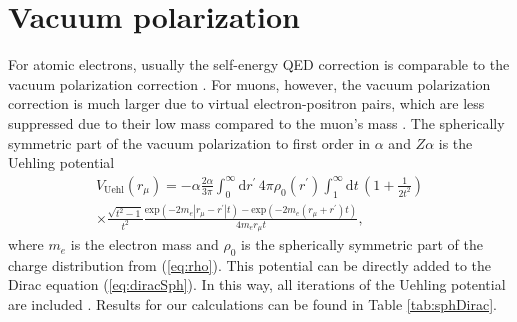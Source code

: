 \section{Vacuum polarization}
\label{sec:qed}

For atomic electrons, usually the self-energy QED correction is comparable to the vacuum polarization correction \cite{Beier2000}. For muons, however, the vacuum polarization correction is much larger due to virtual electron-positron pairs, which are less suppressed due to their low mass compared to the muon's mass \cite{BorieRinker1982}. The spherically symmetric part of the vacuum polarization to first order in $\alpha$ and $Z\alpha$ is the Uehling potential \cite{Elizarov2005}
\begin{align}
V_{\text{Uehl}}(r_\mu)=-\alpha \frac{2\alpha}{3\pi}\int_0^\infty \text{d}r^{\prime}\,4\pi \rho_0(r^\prime)\int_1^\infty \text{d}t\,\left( 1+\frac{1}{2t^2} \right)\nonumber\\
\times\frac{\sqrt{t^2-1}}{t^2} \frac{\text{exp}(-2m_e|r_\mu-r^\prime|t)-\text{exp}(-2m_e(r_\mu+r^\prime)t)}{4m_er_\mu t},
\label{eq:uehl_2}
\end{align}
where $m_e$ is the electron mass and $\rho_0$ is the spherically symmetric part of the charge distribution from (\ref{eq:rho}). This potential can be directly added to the Dirac equation (\ref{eq:diracSph}). In this way, all iterations of the Uehling potential are included \cite{indelicato2013}. Results for our calculations can be found in Table \ref{tab:sphDirac}.
%
%
